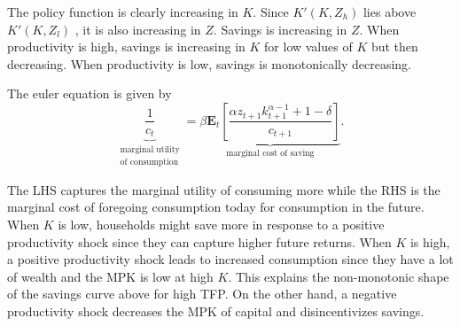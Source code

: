 \documentclass[10pt]{article}
\begin{document}
The policy function is clearly increasing in $K$. Since $K'(K, Z_{h})$ lies above $K'(K, Z_{l})$ , it is also increasing in $Z$. Savings is increasing in $Z$. When productivity is high, savings is increasing in $K$ for low values of $K$ but then decreasing. When productivity is low, savings is monotonically decreasing. 

The euler equation is given by 
\[ \underbrace{\frac{1}{c_t}}_{\substack{\text{marginal utility} \\  \text{of consumption}}} = \underbrace{\beta \mathbf{E}_t \left[ \frac{\alpha z_{t+1} k_{t+1}^{\alpha - 1} + 1 - \delta }{c_{t+1}} \right]}_{\text{marginal cost of saving}} . \]

The LHS captures the marginal utility of consuming more while the RHS is the marginal cost of foregoing consumption today for consumption in the future. When $K$ is low, households might save more in response to a positive productivity shock since they can capture higher future returns. When $K$ is high, a positive productivity shock
leads to increased consumption since they have a lot of wealth and the MPK is low at high $K$. This explains the non-monotonic shape of the savings curve above for high TFP. On the other hand, a negative productivity shock decreases the MPK of capital and disincentivizes savings. 
\end{document}
